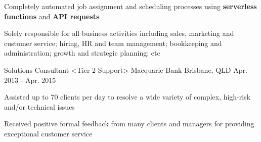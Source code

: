 \begin{cventries}
{\begin{cvitems}
        \item {Completely automated job assignment and scheduling processes using \textbf{serverless functions} and \textbf{API requests}}
        \item {Solely responsible for all business activities including sales, marketing and customer service; hiring, HR and team management; bookkeeping and administration; growth and strategic planning; etc}
      \end{cvitems}
    }
  \cventry
    {Solutions Consultant <Tier 2 Support>}
    {Macquarie Bank}
    {Brisbane, QLD}
    {Apr. 2013 - Apr. 2015}
    {
      \begin{cvitems}
        \item {Assisted up to 70 clients per day to resolve a wide variety of complex, high-risk and/or technical issues}
        \item {Received positive formal feedback from many clients and managers for providing exceptional customer service}
      \end{cvitems}
    }
  \end{cventries}
